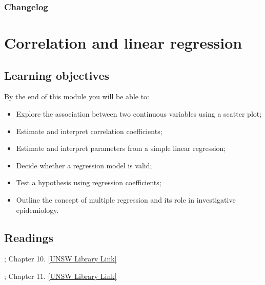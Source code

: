 \documentclass[
]{memoir}
\providecommand{\tightlist}{%
  \setlength{\itemsep}{0pt}\setlength{\parskip}{0pt}}
\begin{document}
\hypertarget{changelog}{%
\subsection*{Changelog}\label{changelog}}

\hypertarget{correlation-and-linear-regression}{%
\chapter{Correlation and linear regression}\label{correlation-and-linear-regression}}

\hypertarget{learning-objectives}{%
\section*{Learning objectives}\label{learning-objectives}}

By the end of this module you will be able to:

\begin{itemize}
\tightlist
\item
  Explore the association between two continuous variables using a scatter plot;
\item
  Estimate and interpret correlation coefficients;
\item
  Estimate and interpret parameters from a simple linear regression;
\item
  Decide whether a regression model is valid;
\item
  Test a hypothesis using regression coefficients;
\item
  Outline the concept of multiple regression and its role in investigative epidemiology.
\end{itemize}

\hypertarget{readings}{%
\section*{Readings}\label{readings}}

\citet{kirkwood_sterne01}; Chapter 10. \href{http://er1.library.unsw.edu.au/er/cgi-bin/eraccess.cgi?url=https://ebookcentral.proquest.com/lib/unsw/detail.action?docID=624728}{{[}UNSW Library Link{]}}

\citet{bland15}; Chapter 11. \href{http://er1.library.unsw.edu.au/er/cgi-bin/eraccess.cgi?url=https://ebookcentral.proquest.com/lib/unsw/detail.action?docID=5891730}{{[}UNSW Library Link{]}}
\end{document}
